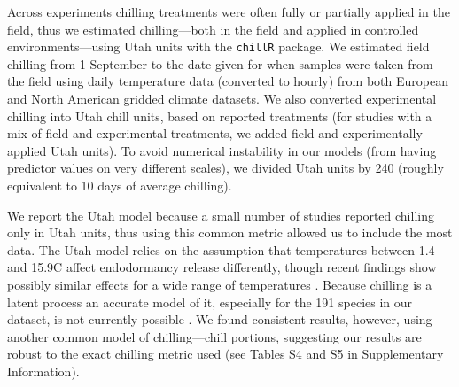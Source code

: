 \documentclass[11pt]{article}
\begin{document}
Across experiments chilling treatments were often fully or partially applied in the field, thus we estimated chilling---both in the field and applied in controlled environments---using Utah units with the \verb|chillR| package. We estimated field chilling from 1 September to the date given for when samples were taken from the field using daily temperature data (converted to hourly) from both European \citep[E-OBS, version 16, calculating the average of minimum and maximum daily temps,][]{cornes2018} and North American \citep[v3,][]{princetonclimate} gridded climate datasets. We also converted experimental chilling into Utah chill units, based on reported treatments (for studies with a mix of field and experimental treatments, we added field and experimentally applied Utah units). To avoid numerical instability in our models (from having predictor values on very different scales), we divided Utah units by 240 (roughly equivalent to 10 days of average chilling). 


We report the Utah model because a small number of studies reported chilling only in Utah units, thus using this common metric allowed us to include the most data. The Utah model relies on the assumption that temperatures between 1.4 and 15.9\degree C affect endodormancy release differently, though recent findings show possibly similar effects for a wide range of temperatures \citep[-2 to 10\degree C, see][]{baum2021}. Because chilling is a latent process an accurate model of it, especially for the 191 species in our dataset, is not currently possible \citep{ettinger2020}. We found consistent results, however, using another common model of chilling---chill portions, suggesting our results are robust to the exact chilling metric used (see Tables S4 and S5 in Supplementary Information).  
\end{document}
